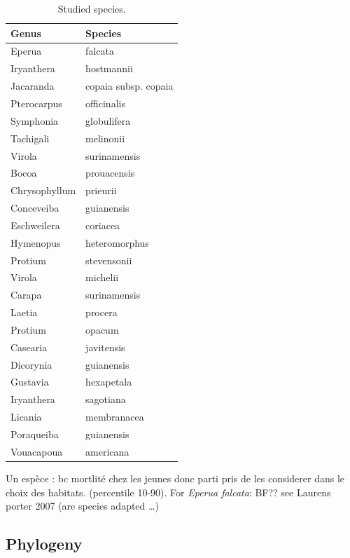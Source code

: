 \documentclass[
]{book}
\begin{document}
\begin{table}

\caption{\label{tab:unnamed-chunk-2}Studied species.}
\centering
\begin{tabular}[t]{l|l}
\hline
Genus & Species\\
\hline
Eperua & falcata\\
\hline
Iryanthera & hostmannii\\
\hline
Jacaranda & copaia subsp. copaia\\
\hline
Pterocarpus & officinalis\\
\hline
Symphonia & globulifera\\
\hline
Tachigali & melinonii\\
\hline
Virola & surinamensis\\
\hline
Bocoa & prouacensis\\
\hline
Chrysophyllum & prieurii\\
\hline
Conceveiba & guianensis\\
\hline
Eschweilera & coriacea\\
\hline
Hymenopus & heteromorphus\\
\hline
Protium & stevensonii\\
\hline
Virola & michelii\\
\hline
Carapa & surinamensis\\
\hline
Laetia & procera\\
\hline
Protium & opacum\\
\hline
Casearia & javitensis\\
\hline
Dicorynia & guianensis\\
\hline
Gustavia & hexapetala\\
\hline
Iryanthera & sagotiana\\
\hline
Licania & membranacea\\
\hline
Poraqueiba & guianensis\\
\hline
Vouacapoua & americana\\
\hline
\end{tabular}
\end{table}

Un espèce : bc mortlité chez les jeunes donc parti pris de les considerer dans le choix des habitats. (percentile 10-90).
For \emph{Eperua falcata}: BF?? see Laurens porter 2007 (are species adapted \ldots)

\hypertarget{phylogeny}{%
\subsection{Phylogeny}\label{phylogeny}}
\end{document}
